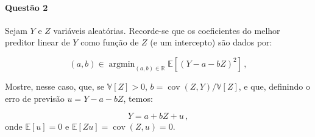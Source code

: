 \documentclass[10pt,a4paper]{article}
\begin{document}
\paragraph{Questão 2} Sejam $Y$ e $Z$ variáveis aleatórias. Recorde-se que os coeficientes do melhor preditor linear de $Y$ como função de $Z$ (e um intercepto) são  dados por:

$$(a,b) \in \operatorname{argmin}_{(a,b) \in \mathbb{R}}\mathbb{E}[(Y-a-bZ)^2]\,,$$

Mostre, nesse caso, que, se $\mathbb{V}[Z] > 0$, $b =\operatorname{cov}(Z,Y)/\mathbb{V}[Z]$, e que, definindo o erro de previsão $u = Y - a - b Z$, temos:

$$Y = a + bZ + u \, ,$$
onde $\mathbb{E}[u] = 0$ e $\mathbb{E}[Zu] = \operatorname{cov}(Z,u) = 0$.

	
\end{document}
